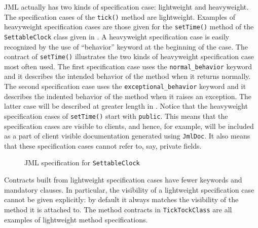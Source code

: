 \documentclass{llncs}
\begin{document}
JML actually has two kinds of specification case: lightweight and heavyweight.
%
The specification cases of the \texttt{tick()} method are lightweight.
%
%
Examples of heavyweight specification cases are those given for the
\texttt{setTime()} method of the \texttt{SettableClock} class given in
.
%
A heavyweight specification case is easily recognized by the use of
``behavior'' keyword at the beginning of the case.
%
The contract of \texttt{setTime()} illustrates the two kinds of heavyweight
specification case most often used.
%
The first specification case uses the \texttt{normal\_behavior} keyword and it
describes the intended behavior of the method when it returns normally.
%
%
The second specification case uses the \texttt{exceptional\_behavior} keyword and it
describes the indented behavior of the method when it raises an exception.
%
The latter case will be described at greater length in .
Notice that the heavyweight specification cases of \texttt{setTime()} start
with \texttt{public}.
%
%
This means that the specification cases are visible to clients, and hence, for
example, will be included as a part of client visible documentation generated
using \texttt{JmlDoc}. It also means that these specification cases cannot
refer to, say, private fields.

\begin{figure}[tbp]
%

%
\vspace*{-2ex} %
\caption{JML specification for \texttt{SettableClock}}
\label{Example:SettableClock}
\end{figure}
%
Contracts built from lightweight specification cases have fewer keywords and
mandatory clauses.  In particular, the visibility of a lightweight
specification case cannot be given explicitly: by default it always matches
the visibility of the method it is attached to.
%
The method  contracts in \texttt{TickTockClass} are all examples of 
lightweight method specifications.


\end{document}
